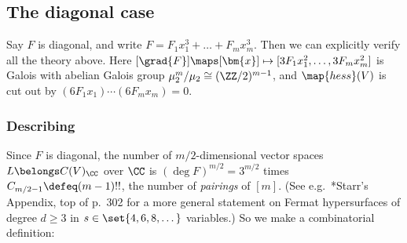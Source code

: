 \documentclass[12pt]{report}
\begin{document}

\subsection{The diagonal case}
\label{SUBSEC:diagonal-dual-example}

Say $F$ is diagonal,
and write $F = F_1x_1^3 + \dots + F_mx_m^3$.
Then we can explicitly verify all the theory above.
Here $[\grad{F}]\maps [\bm{x}]\mapsto [3F_1x_1^2,\dots,3F_mx_m^2]$ is Galois with abelian Galois group $\mu_2^m/\mu_2\cong (\ZZ/2)^{m-1}$,
and $\map{hess}(V)$ is cut out by $(6F_1x_1)\cdots(6F_mx_m)=0$.

\subsubsection{Describing }

Since $F$ is diagonal,
the number of $m/2$-dimensional vector spaces $L\belongs C(V)_\CC$ over $\CC$ is $(\deg{F})^{m/2}=3^{m/2}$ times
$C_{m/2-1}\defeq (m-1)!!$, the number of \emph{pairings} of $[m]$.
(See e.g.~\cite{starr2005fact_in_browning2006density}*{Starr's Appendix, top of p.~302} for a more general statement on Fermat hypersurfaces of degree $d\geq3$ in $s\in\set{4,6,8,\dots}$ variables.)
So we make a combinatorial definition:
\end{document}
